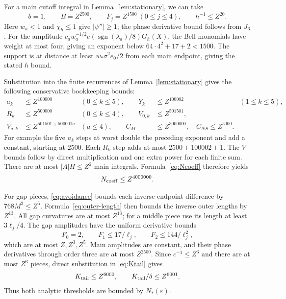\documentclass[11pt]{article}
\theoremstyle{remark}
\newcommand{\sgn}{\operatorname{sgn}}
\begin{document}
For a main cutoff integral in Lemma~\ref{lem:stationary}, we can take
\begin{equation}\label{eq:stationary-Z}
 b=1,\qquad B=Z^{2500},\qquad
 F_j=Z^{1500}\ (0\le j\le4),\qquad h^{-1}\le Z^{20}.
\end{equation}
Here $w_a<1$ and $\chi_h\le1$ give $|\psi''|\ge1$; the phase
derivative bound follows from $J_6$. For the amplitude
$c_a w_a^{-1/2}e(\sgn(\lambda_a)/8)G_h(X)$, the Bell monomials have
weight at most four, giving an exponent below $64\cdot4^2+17+2<1500$.
The support is at distance at least $w_*\sigma^2e_0/2$ from each main
endpoint, giving the stated $h$ bound.

Substitution into the finite recurrences of Lemma~\ref{lem:stationary}
gives the following conservative bookkeeping bounds:
\begin{align*}
 a_k&\le Z^{100000} &(0\le k\le5),\qquad
 Y_k&\le Z^{100002} &(1\le k\le5),\\
 R_k&\le Z^{500000} &(0\le k\le4),\qquad
 V_{0,k}&\le Z^{501501},\\
 V_{a,k}&\le Z^{501501+500001a} &(a\le4),\qquad
 C_M&\le Z^{3000000},\quad C_{NS}\le Z^{5000}.
\end{align*}
For example the five $a_k$ steps at worst double the preceding exponent
and add a constant, starting at $2500$. Each $R_k$ step adds at most
$2500+100002+1$. The $V$ bounds follow by direct multiplication and
one extra power for each finite sum. There are at most $|A|H\le Z^2$
main integrals. Formula~\eqref{eq:Ncoeff} therefore yields
\begin{equation}\label{eq:Ncoeff-Z}
 N_{\rm coeff}\le Z^{4000000}.
\end{equation}

For gap pieces, \eqref{eq:avoidance} bounds each inverse endpoint
difference by $768M^2\le Z^5$. Formula~\eqref{eq:outer-length} then
bounds the inverse outer lengths by $Z^{13}$. All gap curvatures are
at most $Z^{13}$; for a middle piece use its length at least
$3\ell_j/4$. The gap amplitudes have the uniform derivative bounds
\[
 F_0=2,\qquad F_1\le17/\ell_j,\qquad F_2\le144/\ell_j^2,
\]
which are at most $Z,Z^3,Z^5$. Main amplitudes are constant, and their
phase derivatives through order three are at most $Z^{2500}$.
Since $c^{-1}\le Z^3$ and there are at most $Z^3$ pieces, direct
substitution in \eqref{eq:Ktail} gives
\begin{equation}\label{eq:Ktail-Z}
 K_{\rm tail}\le Z^{6000},\qquad K_{\rm tail}/\delta\le Z^{6001}.
\end{equation}
Thus both analytic thresholds are bounded by $N_*(\varepsilon)$.
\end{document}
